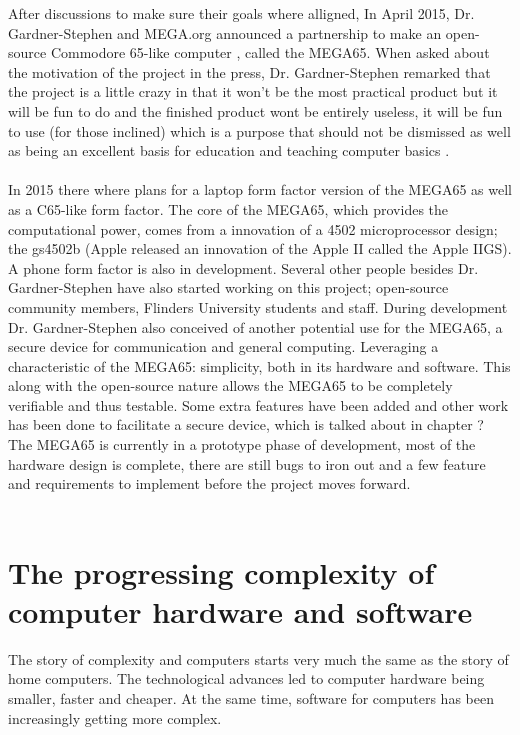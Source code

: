 After discussions to make sure their goals where alligned, In April 2015, Dr. Gardner-Stephen and MEGA.org announced a partnership to make an open-source Commodore 65-like computer \cite{megaintro}, called the MEGA65. When asked about the motivation of the project in the press, Dr. Gardner-Stephen remarked that the project is a little crazy in that it won't be the most practical product but it will be fun to do and the finished product wont be entirely useless, it will be fun to use (for those inclined) which is a purpose that should not be dismissed as well as being an excellent basis for education and teaching computer basics \cite{blogapril15}.  \\\\
In 2015 there where plans for a laptop form factor version of the MEGA65 as well as a C65-like form factor. The core of  the MEGA65, which provides the computational power, comes from a innovation of a 4502 microprocessor design; the gs4502b (Apple released an innovation of the Apple II called the Apple IIGS). A phone form factor is also in development. Several other people besides Dr. Gardner-Stephen have also started working on this project; open-source community members, Flinders University students and staff. During development Dr. Gardner-Stephen also conceived of another potential use for the MEGA65, a secure device for communication and general computing. Leveraging a characteristic of the MEGA65: simplicity, both in its hardware and software. This along with the open-source nature allows the MEGA65 to be completely verifiable and thus testable. Some extra features have been added and other work has been done to facilitate a secure device, which is talked about in chapter ? The MEGA65 is currently in a prototype phase of development, most of the hardware design is complete, there are still bugs to iron out and a few feature and requirements to implement before the project moves forward. \\\\

\section{The progressing complexity of computer hardware and software}
The story of complexity and computers starts very much the same as the story of home computers. The technological advances led to computer hardware being smaller, faster and cheaper. At the same time, software for computers has been increasingly getting more complex. 

